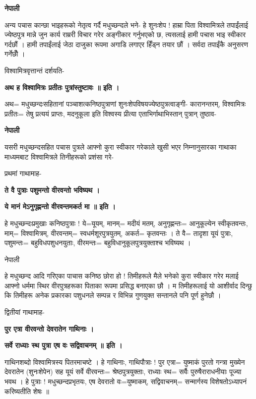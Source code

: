 \documentclass[11pt, a5paper]{article}
\begin{document}
\textbf{नेपाली}

अन्य पचास कान्छा भाइहरूको नेतृत्व गर्दै मधुच्छन्दले भने-  हे शुनःशेप ! हाम्रा पिता विश्वामित्रले तपाईंलाई ज्येष्ठपुत्र मान्ने जुन कार्य राम्ररी विचार गरेर अङ्‌गीकार गर्नुभएको छ, त्यसलाई हामी पचास भाइ स्वीकार गर्दछौं । हामी तपाईंलाई जेठा दाजुका रूपमा अगाडि लगाएर हिँड्न तयार छौं । सर्वदा तपाईंकै अनुसरण गर्नेछौँ ।

विश्वामित्रवृत्तान्तं दर्शयति-

\textbf{अथ ह विश्वामित्रः प्रतीतः पुत्रांस्तुष्टावः ॥ इति ।}

अथ= मधुच्छन्दःसहितानां पञ्चाशत्कनिष्ठपुत्राणां शुनःशेपविषयज्येष्ठपुत्रत्वाङ्‌गी- कारानन्तरम्, विश्वामित्रः प्रतीतः= तेषु प्रत्ययं प्राप्तः, मदनुकूला इति विश्वस्य प्रीत्या एताभिर्गाथाभिस्तान् पुत्रान् त‍ुष्ठाव-

\textbf{नेपाली}

यसरी मधुच्छन्दसहित पचास पुत्रले आफ्नो कुरा स्वीकार गरेकाले खुसी भएर निम्नानुसारका गाथाका माध्यमबाट विश्वामित्रले तिनीहरूको प्रशंसा गरे-

प्रथमां गाथामाह-

\textbf{ते वै पुत्राः पशुमन्तो वीरवन्तो भविष्यथ ।}

\textbf{ये मानं मेऽनुगृह्णन्तो वीरवन्तमकर्त मा ॥ इति ।}

हे मधुच्छन्दःप्रमुखाः कनिष्ठपुत्राः ! ये=यूयम्, मानम्= मदीयं मतम्, अनुगृह्णन्तः= आनुकूल्येन स्वीकृतवन्तः, माम्= विश्वामित्रम्, वीरवन्तम्= स्वधर्मशूरपुत्रयुतम्, अकर्त= कृतवन्तः । ते वै= तादृशा यूयं पुत्राः, पशुमन्तः= बहुविधपशुधनयुताः, वीरमन्तः= बहुविधानुकूलपुत्रयुक्ताश्च भविष्यथ ।

नेपाली

हे मधुच्छन्द आदि गरिएका पाचास कनिष्ठ छोरा हो ! तिमीहरूले मैले भनेको कुरा स्वीकार गरेर मलाई आफ्नो धर्ममा स्थिर वीरपुत्रहरूका पिताका रूपमा प्रसिद्ध बनाएका छौ । म तिमीहरूलाई यो आशीर्वाद दिन्छु कि तिमीहरू अनेक प्रकारका पशुधनले सम्पन्न र विभिन्न गुणयुक्त सन्तानले पनि पूर्ण हुनेछौ ।

द्वितीयां गाथामाह-

\textbf{पुर एत्रा वीरवन्तो देवरातेन गाथिनाः ।}

\textbf{सर्वे राध्याः स्थ पुत्रा एष वः सद्विवाचनम् ॥ इति ।}

गाथिनशब्दो विश्वामित्रस्य पितरमाचष्टे । हे गाथिनाः, गाथिपौत्राः ! पुर एत्रा= युष्माकं पुरतो गन्त्रा मुख्येन देवरातेन (शुनःशेपेन) सह यूयं सर्वे वीरवन्तः=  श्रेष्ठपुत्रयुक्ताः, राध्याः स्थ= सर्वैः पुरुषैराराधनीयाः पूज्या भवथ । हे पुत्राः ! मधुच्छन्दप्रभृतयः, एष देवरातो वः=युष्माकम्, सद्विवाचनम्= सन्मार्गस्य विशेषतोऽध्यापनं करिष्यतीति शेषः ॥
\end{document}
